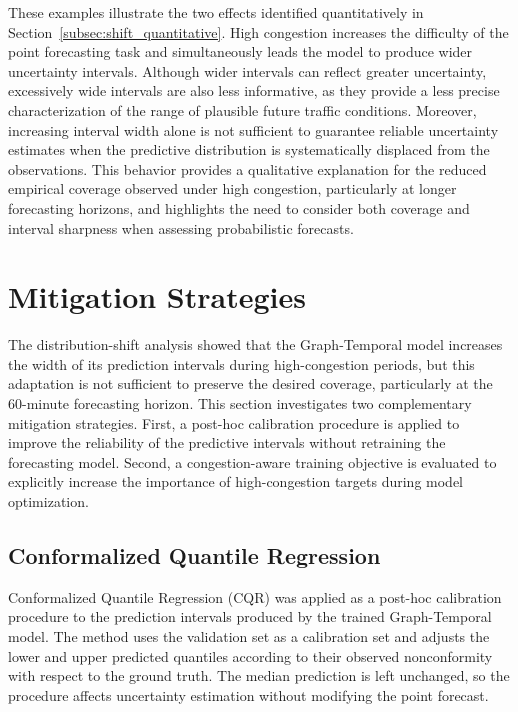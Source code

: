 These examples illustrate the two effects identified quantitatively in
Section~\ref{subsec:shift_quantitative}. High congestion increases the
difficulty of the point forecasting task and simultaneously leads the model
to produce wider uncertainty intervals. Although wider intervals can reflect
greater uncertainty, excessively wide intervals are also less informative,
as they provide a less precise characterization of the range of plausible
future traffic conditions. Moreover, increasing interval width alone is not
sufficient to guarantee reliable uncertainty estimates when the predictive
distribution is systematically displaced from the observations. This behavior
provides a qualitative explanation for the reduced empirical coverage
observed under high congestion, particularly at longer forecasting horizons,
and highlights the need to consider both coverage and interval sharpness when
assessing probabilistic forecasts.


\section{Mitigation Strategies}
\label{sec:mitigation}

The distribution-shift analysis showed that the Graph-Temporal model
increases the width of its prediction intervals during high-congestion
periods, but this adaptation is not sufficient to preserve the desired
coverage, particularly at the 60-minute forecasting horizon.
This section investigates two complementary mitigation strategies. First,
a post-hoc calibration procedure is applied to improve the reliability of
the predictive intervals without retraining the forecasting model. Second,
a congestion-aware training objective is evaluated to explicitly increase
the importance of high-congestion targets during model optimization.

\subsection{Conformalized Quantile Regression}
\label{subsec:cqr}

Conformalized Quantile Regression (CQR)
\citep{romano2019cqr}
was applied as a post-hoc calibration
procedure to the prediction intervals produced by the trained Graph-Temporal
model. The method uses the validation set as a calibration set and adjusts
the lower and upper predicted quantiles according to their observed
nonconformity with respect to the ground truth. The median prediction is left
unchanged, so the procedure affects uncertainty estimation without modifying
the point forecast.


